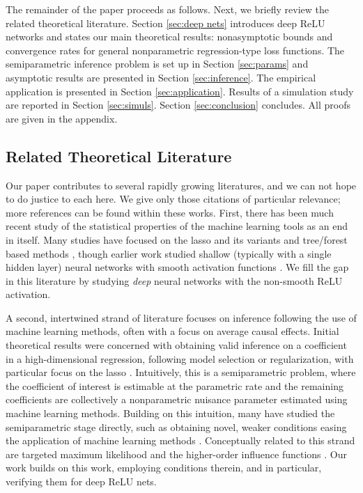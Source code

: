 \documentclass[11pt]{article}
\numberwithin{equation}{section}
\theoremstyle{definition}
\begin{document}
The remainder of the paper proceeds as follows. Next, we briefly review the related theoretical literature. Section \ref{sec:deep nets} introduces deep ReLU networks and states our main theoretical results: nonasymptotic bounds and convergence rates for general nonparametric regression-type loss functions. The semiparametric inference problem is set up in Section \ref{sec:params} and asymptotic results are presented in Section \ref{sec:inference}. The empirical application is presented in Section \ref{sec:application}. Results of a simulation study are reported in Section \ref{sec:simuls}. Section \ref{sec:conclusion} concludes. All proofs are given in the appendix. 




\subsection{Related Theoretical Literature}
	\label{sec:literature}


Our paper contributes to several rapidly growing literatures, and we can not hope to do justice to each here. We give only those citations of particular relevance; more references can be found within these works. First, there has been much recent study of the statistical properties of the machine learning tools as an end in itself. Many studies have focused on the lasso and its variants \citep{Bickel-Ritov-Tsybakov2009_AoS,Belloni-Chernozhukov-Wang2011_Bmka,BCCH2012_Ecma,Farrell2015_arXiv} and tree/forest based methods \citep{Wager-Athey2018_JASA}, though earlier work studied shallow (typically with a single hidden layer) neural networks with smooth activation functions \citep{white1989learning, white1992artificial, Chen-White1999_IEEE}. We fill the gap in this literature by studying \emph{deep} neural networks with the non-smooth ReLU activation.


A second, intertwined strand of literature focuses on inference following the use of machine learning methods, often with a focus on average causal effects. Initial theoretical results were concerned with obtaining valid inference on a coefficient in a high-dimensional regression, following model selection or regularization, with particular focus on the lasso \citep{BCCH2012_Ecma,Javanmard-Montanari2014_JMLR,vandeGeer-etal2014_AoS}. Intuitively, this is a semiparametric problem, where the coefficient of interest is estimable at the parametric rate and the remaining coefficients are collectively a nonparametric nuisance parameter estimated using machine learning methods. Building on this intuition, many have studied the semiparametric stage directly, such as obtaining novel, weaker conditions easing the application of machine learning methods \citep[][and references therein]{Belloni-Chernozhukov-Hansen2014_REStud,Farrell2015_arXiv,Chernozhukov-etal2018_WP,Belloni-etal2018_handbook}. Conceptually related to this strand are targeted maximum likelihood \citep{vanderLaan-Rose2011_book} and the higher-order influence functions \citep{Robins-etal2008_IMS,Robins-etal2017_AoS}. Our work builds on this work, employing conditions therein, and in particular, verifying them for deep ReLU nets.
\end{document}
